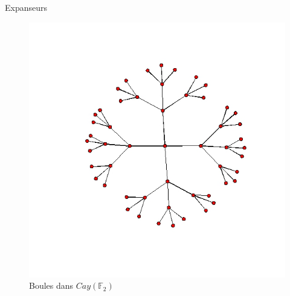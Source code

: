 \begin{frame}{Expanseurs}
\begin{figure}[h]\centering
\includegraphics[scale=0.35]{CayleyFree2.jpeg}
\caption{Boules dans $Cay(\mathbb F_2)$}
\label{fig:Cayley}
\end{figure}
\end{frame}

